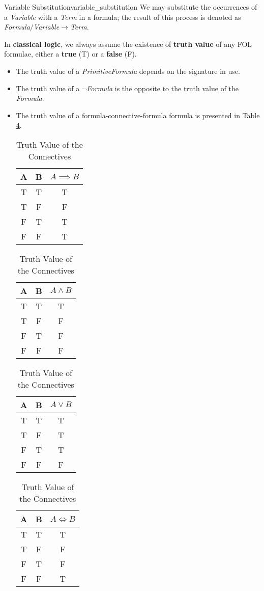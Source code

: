 \documentclass[../main.tex]{subfiles}
\begin{document}
\begin{definition}{Variable Substitution}{variable_substitution}
We may substitute the occurrences of a \textit{Variable} with a \textit{Term} in a formula; the result of this process is denoted as \textit{Formula}$/$\textit{Variable}$\to$\textit{Term}.
\end{definition}

In \textbf{classical logic}, we always assume the existence of \textbf{truth value} of any FOL formulae, either a \textbf{true} (T) or a \textbf{false} (F). 
\begin{itemize}
    \item The truth value of a \textit{PrimitiveFormula} depends on the signature in use.
    \item The truth value of a $\neg$\textit{Formula} is the opposite to the truth value of the \textit{Formula}.
    \item The truth value of a formula-connective-formula formula is presented in Table \ref{tab:connective_truth_value}.
\begin{center}
\begin{table}[!htbp]
\caption{Truth Value of the Connectives}
\label{tab:connective_truth_value}
\begin{tabular}{cc|c}
A&B&$A\implies B$\\\hline
T&T&T\\
T&F&F\\
F&T&T\\
F&F&T
\end{tabular}\hfill
\begin{tabular}{cc|c}
A&B&$A\land B$\\\hline
T&T&T\\
T&F&F\\
F&T&F\\
F&F&F
\end{tabular}\hfill
\begin{tabular}{cc|c}
A&B&$A\lor B$\\\hline
T&T&T\\
T&F&T\\
F&T&T\\
F&F&F
\end{tabular}\hfill
\begin{tabular}{cc|c}
A&B&$A\iff B$\\\hline
T&T&T\\
T&F&F\\
F&T&F\\
F&F&T
\end{tabular}

\end{table}
\end{center}
\end{itemize}
\end{document}

